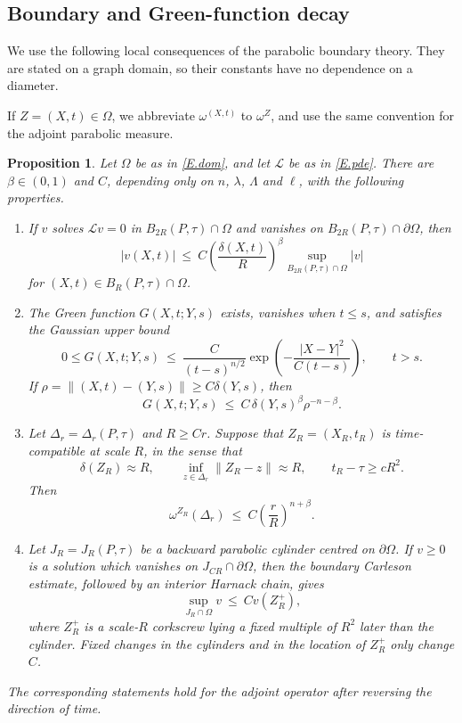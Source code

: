 \documentclass[12pt,leqno]{amsart}
\numberwithin{equation}{section}
\newcommand{\om}{\Omega}
\newcommand{\pom}{\partial\Omega}
\newcommand{\LL}{\mathcal L}
\theoremstyle{plain}
\newtheorem{proposition}[equation]{Proposition}
\theoremstyle{remark}
\begin{document}
\subsection{Boundary and Green-function decay}\label{ss.potdecay}

We use the following local consequences of the parabolic boundary
theory. They are stated on a graph domain, so their constants have no
dependence on a diameter.

If $Z=(X,t)\in\om$, we abbreviate $\omega^{(X,t)}$ to $\omega^Z$, and use
the same convention for the adjoint parabolic measure.

\begin{proposition}\label{P.potdecay}
Let $\om$ be as in \eqref{E.dom}, and let $\LL$ be as in \eqref{E.pde}. There
are $\beta\in(0,1)$ and $C$, depending only on $n$, $\lambda$, $\Lambda$ and
$\ell$, with the following properties.
\begin{enumerate}
\item If $v$ solves $\LL v=0$ in $B_{2R}(P,\tau)\cap\om$ and vanishes on
  $B_{2R}(P,\tau)\cap\pom$, then
  \begin{equation}\label{E.bdryHolder}
   |v(X,t)|\ \le\ C\left(\frac{\delta(X,t)}R\right)^\beta
   \sup_{B_{2R}(P,\tau)\cap\om}|v|
  \end{equation}
  for $(X,t)\in B_R(P,\tau)\cap\om$.
\item The Green function $G(X,t;Y,s)$ exists, vanishes when $t\le s$, and
  satisfies the Gaussian upper bound
  \begin{equation}\label{E.GreenGaussian}
   0\le G(X,t;Y,s)\ \le\
   \frac{C}{(t-s)^{n/2}}
   \exp\left(-\frac{|X-Y|^2}{C(t-s)}\right),\qquad t>s.
  \end{equation}
  If $\rho=\|(X,t)-(Y,s)\|\ge C\delta(Y,s)$, then
  \begin{equation}\label{E.Greenbdry}
   G(X,t;Y,s)\ \le\ C\,\delta(Y,s)^\beta\rho^{-n-\beta}.
  \end{equation}
\item Let $\Delta_r=\Delta_r(P,\tau)$ and $R\ge Cr$.  Suppose that
  $Z_R=(X_R,t_R)$ is time-compatible at scale $R$, in the sense that
  \[
   \delta(Z_R)\approx R,\qquad
   \inf_{z\in\Delta_r}\|Z_R-z\|\approx R,\qquad t_R-\tau\ge cR^2.
  \]
  Then
  \begin{equation}\label{E.omegadecay}
   \omega^{Z_R}(\Delta_r)\ \le\ C\left(\frac rR\right)^{n+\beta}.
  \end{equation}
\item Let $J_R=J_R(P,\tau)$ be a backward parabolic cylinder centred on
  $\pom$. If $v\ge0$ is a solution which vanishes on $J_{CR}\cap\pom$, then
  the boundary Carleson estimate, followed by an interior
  Harnack chain, gives
  \begin{equation}\label{E.boundaryCarleson}
   \sup_{J_R\cap\om}v\ \le\ C v(Z_R^+),
  \end{equation}
  where $Z_R^+$ is a scale-$R$ corkscrew lying a fixed multiple of $R^2$
  later than the cylinder. Fixed changes in the cylinders and in the
  location of $Z_R^+$ only change $C$.
\end{enumerate}
The corresponding statements hold for the adjoint operator after reversing
the direction of time.
\end{proposition}
\end{document}
